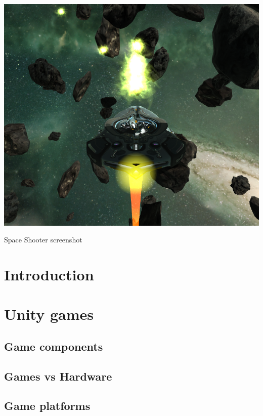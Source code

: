 \documentclass[sigconf]{acmart}
\begin{document}
\begin{teaserfigure}
  \centering
  \includegraphics[width=\linewidth]{images/teaser}
  \caption{Space Shooter screenshot}
  \label{fig:teaser}
  \vspace{0.03cm}
\end{teaserfigure}
\maketitle
\section{Introduction}

\section{Unity games}
\subsection{Game components}

\subsection{Games vs Hardware}

\subsection{Game platforms}

\end{document}
